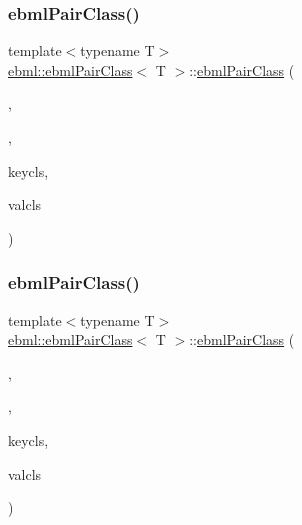 \mbox{\label{classebml_1_1ebmlPairClass_a2830fdd542ad3a6d25dba990956e0818}} 
\subsubsection{\texorpdfstring{ebml\+Pair\+Class()}{ebmlPairClass()}\hspace{0.1cm}{\footnotesize\ttfamily [2/4]}}
{\footnotesize\ttfamily template$<$typename T$>$ \\
\mbox{\hyperlink{classebml_1_1ebmlPairClass}{ebml\+::ebml\+Pair\+Class}}$<$ T $>$\+::\mbox{\hyperlink{classebml_1_1ebmlPairClass}{ebml\+Pair\+Class}} (\begin{DoxyParamCaption}\item[{const char $\ast$}]{,  }\item[{const std\+::wstring \&}]{,  }\item[{const \mbox{\hyperlink{classebml_1_1ebmlDataElementClass}{ebml\+Data\+Element\+Class}}$<$ T $>$ $\ast$}]{keycls,  }\item[{const \mbox{\hyperlink{classebml_1_1ebmlElementClass}{ebml\+Element\+Class}} $\ast$}]{valcls }\end{DoxyParamCaption})}

\mbox{\label{classebml_1_1ebmlPairClass_ab1d08a05b102e555cb16e3416dda5fec}} 
\subsubsection{\texorpdfstring{ebml\+Pair\+Class()}{ebmlPairClass()}\hspace{0.1cm}{\footnotesize\ttfamily [3/4]}}
{\footnotesize\ttfamily template$<$typename T$>$ \\
\mbox{\hyperlink{classebml_1_1ebmlPairClass}{ebml\+::ebml\+Pair\+Class}}$<$ T $>$\+::\mbox{\hyperlink{classebml_1_1ebmlPairClass}{ebml\+Pair\+Class}} (\begin{DoxyParamCaption}\item[{\mbox{\hyperlink{namespaceebml_a86c5f604ddf12a74aa9812e997a58691}{ebml\+I\+D\+\_\+t}}}]{,  }\item[{const std\+::wstring \&}]{,  }\item[{const \mbox{\hyperlink{classebml_1_1ebmlElementClass}{ebml\+Element\+Class}} $\ast$}]{keycls,  }\item[{const \mbox{\hyperlink{classebml_1_1ebmlElementClass}{ebml\+Element\+Class}} $\ast$}]{valcls }\end{DoxyParamCaption})}


